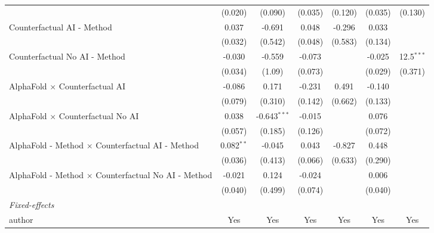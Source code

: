 \begin{tabular}{lcccccc}
                                                              & (0.020)       & (0.090)        & (0.035) & (0.120)       & (0.035)        & (0.130)\\   
   Counterfactual AI - Method                                 & 0.037         & -0.691         & 0.048   & -0.296        & 0.033          &   \\   
                                                              & (0.032)       & (0.542)        & (0.048) & (0.583)       & (0.134)        &   \\   
   Counterfactual No AI - Method                              & -0.030        & -0.559         & -0.073  &               & -0.025         & 12.5$^{***}$\\   
                                                              & (0.034)       & (1.09)         & (0.073) &               & (0.029)        & (0.371)\\   
   AlphaFold $\times$ Counterfactual AI                       & -0.086        & 0.171          & -0.231  & 0.491         & -0.140         &   \\   
                                                              & (0.079)       & (0.310)        & (0.142) & (0.662)       & (0.133)        &   \\   
   AlphaFold $\times$ Counterfactual No AI                    & 0.038         & -0.643$^{***}$ & -0.015  &               & 0.076          &   \\   
                                                              & (0.057)       & (0.185)        & (0.126) &               & (0.072)        &   \\   
   AlphaFold - Method $\times$ Counterfactual AI - Method     & 0.082$^{**}$  & -0.045         & 0.043   & -0.827        & 0.448          &   \\   
                                                              & (0.036)       & (0.413)        & (0.066) & (0.633)       & (0.290)        &   \\   
   AlphaFold - Method $\times$ Counterfactual No AI - Method  & -0.021        & 0.124          & -0.024  &               & 0.006          &   \\   
                                                              & (0.040)       & (0.499)        & (0.074) &               & (0.040)        &   \\   
   \midrule
   \emph{Fixed-effects}\\
   author                                                     & Yes           & Yes            & Yes     & Yes           & Yes            & Yes\\  

\end{tabular}
